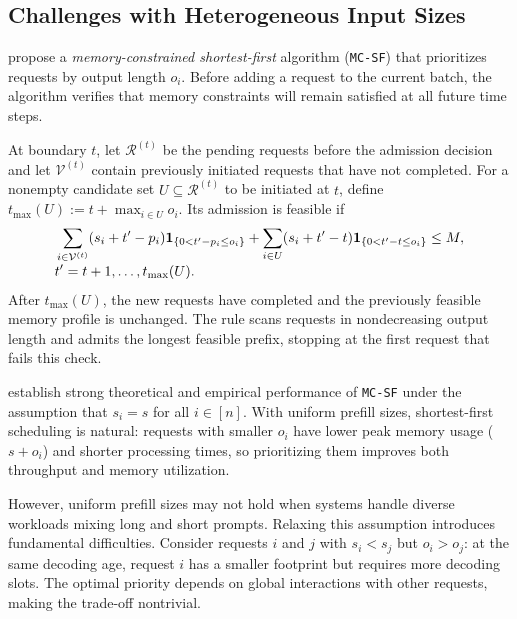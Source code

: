 \documentclass[nonblindrev]{informs3_hide}
\newcommand{\mcsdf}{\texttt{MC-SF}}
\begin{document}
\subsection{Challenges with Heterogeneous Input Sizes} \label{subsec:sf}

\cite{jaillet2025online} propose a \emph{memory-constrained shortest-first} algorithm (\mcsdf) that prioritizes requests by output length \(o_i\). Before adding a request to the current batch, the algorithm verifies that memory constraints will remain satisfied at all future time steps.

At boundary $t$, let $\mathcal R^{(t)}$ be the pending requests before the admission decision and let $\mathcal V^{(t)}$ contain previously initiated requests that have not completed. For a nonempty candidate set $U\subseteq\mathcal R^{(t)}$ to be initiated at $t$, define $t_{\max}(U):=t+\max_{i\in U}o_i$. Its admission is feasible if
\begin{equation}
\label{eqn:Constraint}
\begin{aligned}
&\sum_{i\in\mathcal V^{(t)}}(s_i+t'-p_i)
    \mathbf 1_{\{0<t'-p_i\le o_i\}}
 +\sum_{i\in U}(s_i+t'-t)
    \mathbf 1_{\{0<t'-t\le o_i\}}\le M,\\[-1mm]
&\hfill t'=t+1,\ldots,t_{\max}(U).
\end{aligned}
\end{equation}
After $t_{\max}(U)$, the new requests have completed and the previously feasible memory profile is unchanged. The rule scans requests in nondecreasing output length and admits the longest feasible prefix, stopping at the first request that fails this check.

\cite{jaillet2025online} establish strong theoretical and empirical performance of \mcsdf{} under the assumption that \(s_i = s\) for all \(i \in [n]\). With uniform prefill sizes, shortest-first scheduling is natural: requests with smaller \(o_i\) have lower peak memory usage (\(s + o_i\)) and shorter processing times, so prioritizing them improves both throughput and memory utilization.

However, uniform prefill sizes may not hold when systems handle diverse workloads mixing long and short prompts. Relaxing this assumption introduces fundamental difficulties. Consider requests \(i\) and \(j\) with \(s_i < s_j\) but \(o_i > o_j\): at the same decoding age, request $i$ has a smaller footprint but requires more decoding slots. The optimal priority depends on global interactions with other requests, making the trade-off nontrivial.
\end{document}
